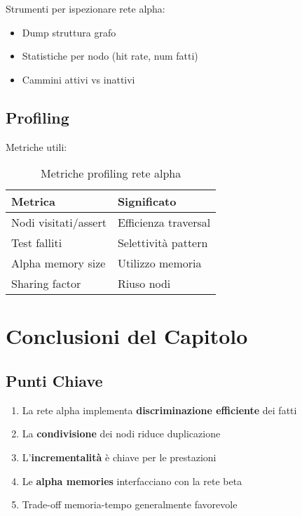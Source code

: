 Strumenti per ispezionare rete alpha:

\begin{itemize}
\item Dump struttura grafo
\item Statistiche per nodo (hit rate, num fatti)
\item Cammini attivi vs inattivi
\end{itemize}

\subsection{Profiling}

Metriche utili:

\begin{table}[h]
\centering
\begin{tabular}{@{}ll@{}}
\toprule
\textbf{Metrica} & \textbf{Significato} \\
\midrule
Nodi visitati/assert & Efficienza traversal \\
Test falliti & Selettività pattern \\
Alpha memory size & Utilizzo memoria \\
Sharing factor & Riuso nodi \\
\bottomrule
\end{tabular}
\caption{Metriche profiling rete alpha}
\end{table}

\section{Conclusioni del Capitolo}

\subsection{Punti Chiave}

\begin{enumerate}
\item La rete alpha implementa \textbf{discriminazione efficiente} dei fatti
\item La \textbf{condivisione} dei nodi riduce duplicazione
\item L'\textbf{incrementalità} è chiave per le prestazioni
\item Le \textbf{alpha memories} interfacciano con la rete beta
\item Trade-off memoria-tempo generalmente favorevole
\end{enumerate}

